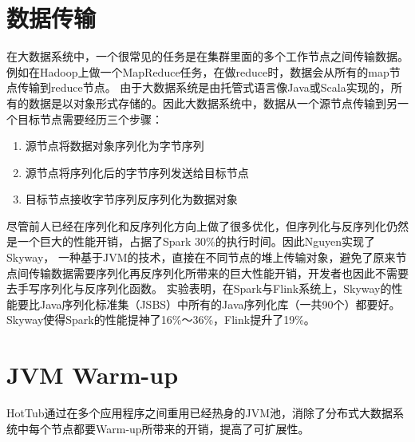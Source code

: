 \section{数据传输}
在大数据系统中，一个很常见的任务是在集群里面的多个工作节点之间传输数据。例如在Hadoop上做一个MapReduce任务，在做reduce时，数据会从所有的map节点传输到reduce节点。
由于大数据系统是由托管式语言像Java或Scala实现的，所有的数据是以对象形式存储的。因此大数据系统中，数据从一个源节点传输到另一个目标节点需要经历三个步骤：
\begin{enumerate}
    \item 源节点将数据对象序列化为字节序列
    \item 源节点将序列化后的字节序列发送给目标节点
    \item 目标节点接收字节序列反序列化为数据对象
\end{enumerate}
尽管前人已经在序列化和反序列化方向上做了很多优化，但序列化与反序列化仍然是一个巨大的性能开销，占据了Spark 30\%的执行时间。因此Nguyen实现了Skyway\cite{nguyen2018skyway}，
一种基于JVM的技术，直接在不同节点的堆上传输对象，避免了原来节点间传输数据需要序列化再反序列化所带来的巨大性能开销，开发者也因此不需要去手写序列化与反序列化函数。
实验表明，在Spark与Flink系统上，Skyway的性能要比Java序列化标准集（JSBS）中所有的Java序列化库（一共90个）都要好。Skyway使得Spark的性能提神了16\%～36\%，Flink提升了19\%。

\section{JVM Warm-up}
HotTub\cite{lion2016don}通过在多个应用程序之间重用已经热身的JVM池，消除了分布式大数据系统中每个节点都要Warm-up所带来的开销，提高了可扩展性。











